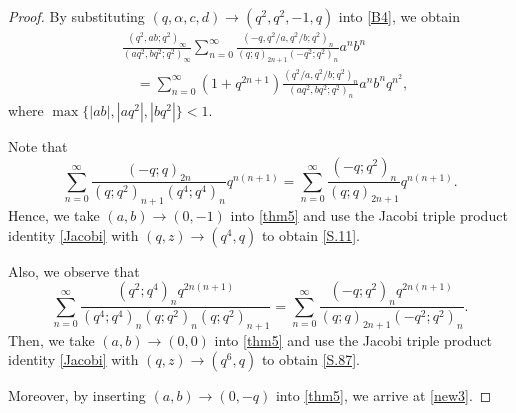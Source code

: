 \documentclass[reqno,12pt]{amsart}
\theoremstyle{remark}
\numberwithin{equation}{section}
\begin{document}
\begin{proof}
By substituting $\left(q,\alpha,c,d\right)\to\left(q^2,q^2,-1,q\right)$ into \eqref{B4}, we obtain
\begin{align}
&\frac{\left(q^2,ab;q^2\right)_{\infty}}
{\left(aq^2,bq^2;q^2\right)_{\infty}}\sum_{n=0}^{\infty}
\frac{\left(-q,q^2/a,q^2/b;q^2\right)_{n}}
{\left(q;q\right)_{2n+1}\left(-q^2;q^2\right)_{n}}a^nb^n\nonumber\\
&\quad=\sum_{n=0}^{\infty}\left(1+q^{2n+1}\right)
\frac{\left(q^2/a,q^2/b;q^2\right)_{n}}
{\left(aq^2,bq^2;q^2\right)_n}
a^nb^nq^{n^2},\label{thm5}
\end{align}
where $\max\{|ab|, |aq^2|,|bq^2|\}<1$.

Note that
\begin{equation*}
\sum_{n=0}^{\infty}\frac{\left(-q;q\right)_{2n}}
{\left(q;q^2\right)_{n+1}\left(q^4;q^4\right)_{n}}q^{n\left(n+1\right)}
=\sum_{n=0}^{\infty}\frac{\left(-q;q^2\right)_{n}}
{\left(q;q\right)_{2n+1}}q^{n\left(n+1\right)}.
\end{equation*}
Hence, we take $\left(a,b\right)\to\left(0,-1\right)$ into \eqref{thm5} and use the Jacobi triple product identity \eqref{Jacobi} with $\left(q,z\right)\to\left(q^4,q\right)$ to obtain \eqref{S.11}.

Also, we observe that
\begin{equation*}
\sum_{n=0}^{\infty}\frac{\left(q^2;q^4\right)_nq^{2n\left(n+1\right)}}
{\left(q^4;q^4\right)_{n}\left(q;q^2\right)_{n}\left(q;q^2\right)_{n+1}}
=\sum_{n=0}^{\infty}\frac{\left(-q;q^2\right)_nq^{2n\left(n+1\right)}}
{\left(q;q\right)_{2n+1}\left(-q^2;q^2\right)_{n}}.
\end{equation*}
Then, we take $\left(a,b\right)\to\left(0,0\right)$ into \eqref{thm5} and use the Jacobi triple product identity \eqref{Jacobi} with $\left(q,z\right)\to\left(q^6,q\right)$ to obtain \eqref{S.87}.

Moreover, by inserting $\left(a,b\right)\to\left(0,-q\right)$ into \eqref{thm5}, we arrive at \eqref{new3}. %
\end{proof}
\end{document}
